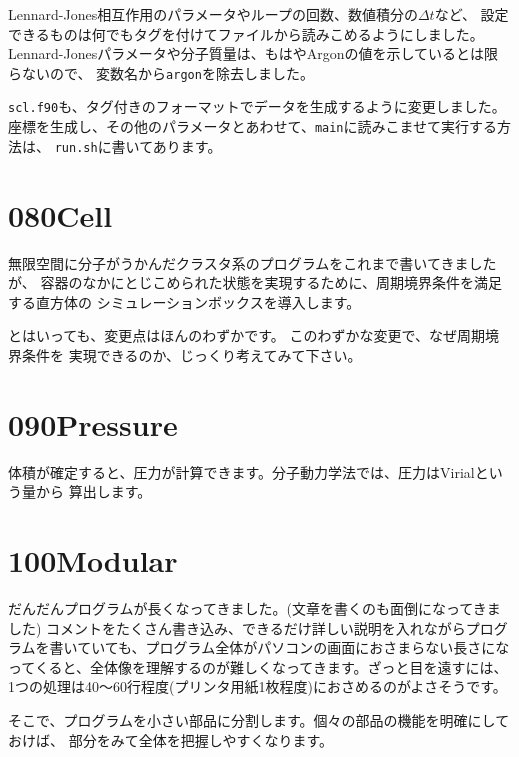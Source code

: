 \documentclass[a4,10pt]{article}
\begin{document}
Lennard-Jones相互作用のパラメータやループの回数、数値積分の$\Delta t$など、
設定できるものは何でもタグを付けてファイルから読みこめるようにしました。
Lennard-Jonesパラメータや分子質量は、もはやArgonの値を示しているとは限らないので、
変数名から{\tt argon}を除去しました。

{\tt scl.f90}も、タグ付きのフォーマットでデータを生成するように変更しました。
座標を生成し、その他のパラメータとあわせて、{\tt main}に読みこませて実行する方法は、
{\tt run.sh}に書いてあります。


\section{080Cell}

無限空間に分子がうかんだクラスタ系のプログラムをこれまで書いてきましたが、
容器のなかにとじこめられた状態を実現するために、周期境界条件を満足する直方体の
シミュレーションボックスを導入します。

とはいっても、変更点はほんのわずかです。
このわずかな変更で、なぜ周期境界条件を
実現できるのか、じっくり考えてみて下さい。


\section{090Pressure}

体積が確定すると、圧力が計算できます。分子動力学法では、圧力はVirialという量から
算出します。


\section{100Modular}

だんだんプログラムが長くなってきました。(文章を書くのも面倒になってきました)
コメントをたくさん書き込み、できるだけ詳しい説明を入れながらプログラムを書いていても、プログラム全体がパソコンの画面におさまらない長さになってくると、全体像を理解するのが難しくなってきます。ざっと目を遠すには、1つの処理は40〜60行程度(プリンタ用紙1枚程度)におさめるのがよさそうです。

そこで、プログラムを小さい部品に分割します。個々の部品の機能を明確にしておけば、
部分をみて全体を把握しやすくなります。
\end{document}
